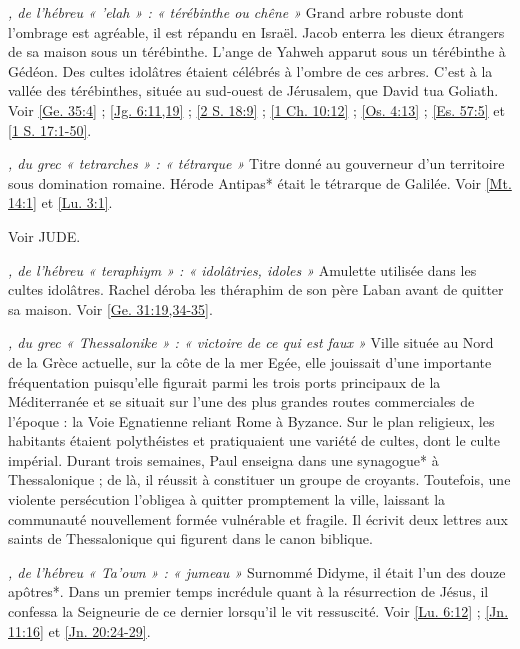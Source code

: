 \begin{multicols}{2}
\textit{, de l'hébreu « 'elah » : « térébinthe ou chêne »}\newline
Grand arbre robuste dont l'ombrage est agréable, il est répandu en Israël. Jacob enterra les dieux étrangers de sa maison sous un térébinthe. L'ange de Yahweh apparut sous un térébinthe à Gédéon. Des cultes idolâtres étaient célébrés à l'ombre de ces arbres. C'est à la vallée des térébinthes, située au sud-ouest de Jérusalem, que David tua Goliath. Voir \vref{Ge. 35:4} ; \vref{Jg. 6:11,19} ; \vref{2 S. 18:9} ; \vref{1 Ch. 10:12} ; \vref{Os. 4:13} ; \vref{Es. 57:5} et \vref{1 S. 17:1-50}.

\textit{, du grec « tetrarches » : « tétrarque »}\newline
Titre donné au gouverneur d'un territoire sous domination romaine. Hérode Antipas* était le tétrarque de Galilée. Voir \vref{Mt. 14:1} et \vref{Lu. 3:1}.

\textit{}\newline
Voir JUDE.

\textit{, de l'hébreu « teraphiym » : « idolâtries, idoles »}\newline
Amulette utilisée dans les cultes idolâtres. Rachel déroba les théraphim de son père Laban avant de quitter sa maison. Voir \vref{Ge. 31:19,34-35}.

\textit{, du grec « Thessalonike » : « victoire de ce qui est faux »}\newline
Ville située au Nord de la Grèce actuelle, sur la côte de la mer Egée, elle jouissait d'une importante fréquentation puisqu'elle figurait parmi les trois ports principaux de la Méditerranée et se situait sur l'une des plus grandes routes commerciales de l'époque : la Voie Egnatienne reliant Rome à Byzance. Sur le plan religieux, les habitants étaient polythéistes et pratiquaient une variété de cultes, dont le culte impérial. Durant trois semaines, Paul enseigna dans une synagogue* à Thessalonique ; de là, il réussit à constituer un groupe de croyants. Toutefois, une violente persécution l'obligea à quitter promptement la ville, laissant la communauté nouvellement formée vulnérable et fragile. Il écrivit deux lettres aux saints de Thessalonique qui figurent dans le canon biblique.

\textit{, de l'hébreu « Ta'own » : « jumeau »}\newline
Surnommé Didyme, il était l'un des douze apôtres*. Dans un premier temps incrédule quant à la résurrection de Jésus, il confessa la Seigneurie de ce dernier lorsqu'il le vit ressuscité. Voir \vref{Lu. 6:12} ; \vref{Jn. 11:16} et \vref{Jn. 20:24-29}.


\end{multicols}
